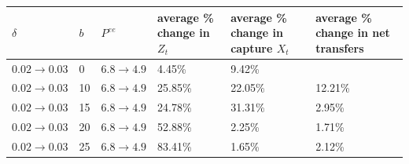 \begin{tabular}{llllll}
\toprule
$\delta$ & $b$ & $P^{ee}$ & average \% change in $Z_t$ & average \% change in capture $X_t$ & average \% change in net transfers \\
\midrule
$0.02\to 0.03$ & 0 & $6.8\to 4.9$ & 4.45\% & 9.42\% &  \\
$0.02\to 0.03$ & 10 & $6.8\to 4.9$ & 25.85\% & 22.05\% & 12.21\% \\
$0.02\to 0.03$ & 15 & $6.8\to 4.9$ & 24.78\% & 31.31\% & 2.95\% \\
$0.02\to 0.03$ & 20 & $6.8\to 4.9$ & 52.88\% & 2.25\% & 1.71\% \\
$0.02\to 0.03$ & 25 & $6.8\to 4.9$ & 83.41\% & 1.65\% & 2.12\% \\
\bottomrule
\end{tabular}
